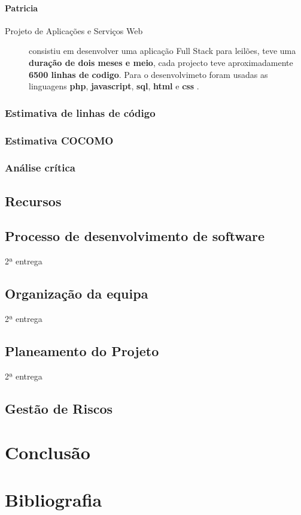 \documentclass[a4paper]{report}
\begin{document}
\subsubsection*{Patricia}
\begin{description}
    \item[Projeto de Aplicações e Serviços Web] consistiu em desenvolver uma aplicação Full Stack para leilões, teve uma \textbf{duração de dois meses e meio}, cada projecto teve aproximadamente \textbf{6500 linhas de codigo}. Para o desenvolvimeto foram usadas as linguagens \textbf{php}, \textbf{javascript}, \textbf{sql}, \textbf{html} e \textbf{css} .
\end{description}

\subsection{Estimativa de linhas de código}
\subsection{Estimativa COCOMO}
\subsection{Análise crítica}
\section{Recursos}
\section{Processo de desenvolvimento de software}
2ª entrega
\section{Organização da equipa}
2ª entrega
\section{Planeamento do Projeto}
2ª entrega
\section{Gestão de Riscos}
\chapter{Conclusão}
\chapter{Bibliografia }
\end{document}
